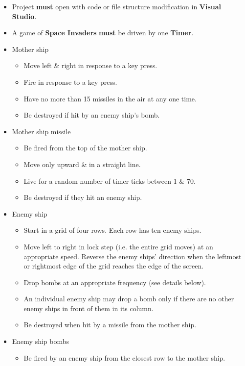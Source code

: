 \documentclass{article}
\begin{document}
\begin{itemize}
    \item Project \textbf{must} open with code or file structure modification in \textbf{Visual Studio}.
    \item A game of \textbf{Space Invaders} \textbf{must} be driven by one \textbf{Timer}.
    \item Mother ship
    \begin{itemize}
        \item Move left \& right in response to a key press.
        \item Fire in response to a key press.
        \item Have no more than 15 missiles in the air at any one time.
        \item Be destroyed if hit by an enemy ship's bomb.
    \end{itemize}
    \item Mother ship missile
    \begin{itemize}
        \item Be fired from the top of the mother ship.
        \item Move only upward \& in a straight line.
        \item Live for a random number of timer ticks between 1 \& 70.
        \item Be destroyed if they hit an enemy ship.
    \end{itemize}
    \item Enemy ship
    \begin{itemize}
        \item Start in a grid of four rows. Each row has ten enemy ships.
        \item Move left to right in lock step (i.e. the entire grid moves) at an appropriate speed. Reverse the enemy ships' direction when the leftmost or rightmost edge of the grid reaches the edge of the screen.
        \item Drop bombs at an appropriate frequency (see details below).
        \item An individual enemy ship may drop a bomb only if there are no other enemy ships in front of them in its column.
        \item Be destroyed when hit by a missile from the mother ship.
    \end{itemize}
    \item Enemy ship bombs
    \begin{itemize}
        \item Be fired by an enemy ship from the closest row to the mother ship. 

\end{itemize}
\end{itemize}
\end{document}
